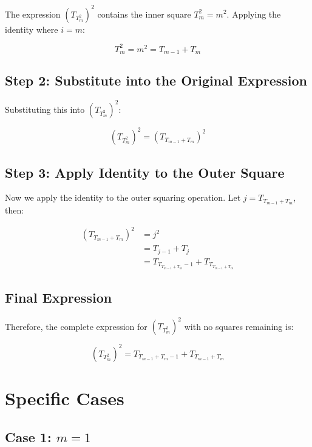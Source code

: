 \documentclass{article}
\begin{document}
The expression $(T_{T_m^2})^2$ contains the inner square $T_m^2 = m^2$. Applying the identity where $i = m$:

\begin{equation}
T_m^2 = m^2 = T_{m-1} + T_m
\end{equation}

\subsection{Step 2: Substitute into the Original Expression}

Substituting this into $(T_{T_m^2})^2$:

\begin{equation}
(T_{T_m^2})^2 = \left(T_{T_{m-1} + T_m}\right)^2
\end{equation}

\subsection{Step 3: Apply Identity to the Outer Square}

Now we apply the identity to the outer squaring operation. Let $j = T_{T_{m-1} + T_m}$, then:

\begin{align}
\left(T_{T_{m-1} + T_m}\right)^2 &= j^2 \\
&= T_{j-1} + T_j \\
&= T_{T_{T_{m-1} + T_m}-1} + T_{T_{T_{m-1} + T_m}}
\end{align}

\subsection{Final Expression}

Therefore, the complete expression for $(T_{T_m^2})^2$ with no squares remaining is:

\begin{equation}
\boxed{(T_{T_m^2})^2 = T_{T_{m-1} + T_m - 1} + T_{T_{m-1} + T_m}}
\end{equation}

\section{Specific Cases}

\subsection{Case 1: $m = 1$}
\end{document}
